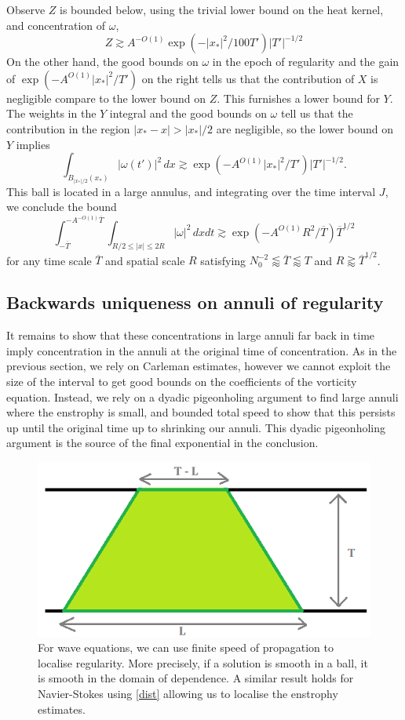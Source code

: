 Observe $Z$ is bounded below, using the trivial lower bound on the heat kernel, and concentration of $\omega$, 
	\[
		Z \gtrsim A^{-O(1)} \exp(-|x_*|^2/100T') |T'|^{-1/2}
	\]
On the other hand, the good bounds on $\omega$ in the epoch of regularity and the gain of $\exp(-A^{O(1)} |x_*|^2/T')$ on the right tells us that the contribution of $X$ is negligible compare to the lower bound on $Z$. This furnishes a lower bound for $Y$. The weights in the $Y$ integral and the good bounds on $\omega$ tell us that the contribution in the region $|x_* - x| >|x_*|/2$ are negligible, so the lower bound on $Y$ implies
	\[
		\int_{B_{|x_*|/2} (x_*)} |\omega(t')|^2 \, dx \gtrsim \exp (-A^{O(1)} |x_*|^2/T') |T'|^{-1/2}. 
	\]
This ball is located in a large annulus, and integrating over the time interval $J$, we conclude the bound
	\[
		\int_{-\overline T}^{-A^{-O(1)} \overline T} \int_{R/2 \leq |x| \leq 2R} |\omega|^2 \, dx dt \gtrsim \exp (-A^{O(1)} R^2/\overline T) \overline T^{1/2}
	\]
for any time scale $\overline T$ and spatial scale $R$ satisfying $N_0^{-2} \lessapprox \overline T \lessapprox T$ and $R \gtrapprox \overline T^{1/2}$. 

\subsection{Backwards uniqueness on annuli of regularity}

It remains to show that these concentrations in large annuli far back in time imply concentration in the annuli at the original time of concentration. As in the previous section, we rely on Carleman estimates, however we cannot exploit the size of the interval to get good bounds on the coefficients of the vorticity equation. Instead, we rely on a dyadic pigeonholing argument to find large annuli where the enstrophy is small, and bounded total speed to show that this persists up until the original time up to shrinking our annuli. This dyadic pigeonholing argument is the source of the final exponential in the conclusion. 

\begin{figure}[h]
	\begin{center}
		\includegraphics[scale = 0.8]{graphics/finite}
		\caption{For wave equations, we can use finite speed of propagation to localise regularity. More precisely, if a solution is smooth in a ball, it is smooth in the domain of dependence. A similar result holds for Navier-Stokes using \eqref{dist} allowing us to localise the enstrophy estimates.}
	\end{center}
\end{figure}


